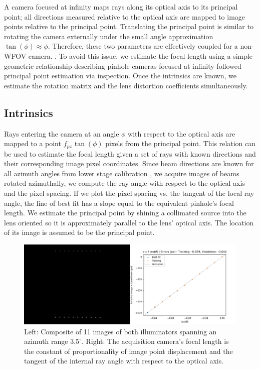 A camera focused at infinity maps rays along its optical axis to its principal point; all directions measured relative to the optical axis are mapped to image points relative to the principal point. Translating the principal point is similar to rotating the camera externally under the small angle approximation $\tan(\phi) \approx \phi$. Therefore, these two parameters are effectively coupled for a non-WFOV camera. . To avoid this issue, we estimate the focal length using a simple geometric relationship describing pinhole cameras focused at infinity followed principal point estimation via inspection. Once the intrinsics are known, we estimate the rotation matrix and the lens distortion coefficients simultaneously.

\subsection{Intrinsics}
Rays entering the camera at an angle $\phi$ with respect to the optical axis are mapped to a point $f_{px} \tan(\phi)$ pixels from the principal point. This relation can be used to estimate the focal length given a set of rays with known directions and their corresponding image pixel coordinates. Since beam directions are known for all azimuth angles from lower stage calibration , we acquire images of beams rotated azimuthally, we compute the ray angle with respect to the optical axis and the pixel spacing. If we plot the pixel spacing vs. the tangent of the local ray angle, the line of best fit has a slope equal to the equivalent pinhole's focal length. We estimate the principal point by shining a collimated source into the lens oriented so it is approximately parallel to the lens' optical axis. The location of its image is assumed to be the principal point.
\begin{figure}
    \centering
    \includegraphics[width=0.75\linewidth]{figures/focal_length_estimate.png}
    \caption{Left: Composite of 11 images of both illuminators spanning an azimuth range $3.5^\circ$. Right: The acquisition camera's focal length is the constant of proportionality of image point displacement and the tangent of the internal ray angle with respect to the optical axis.}
    \label{fig:focal_length_estimate}
\end{figure}

